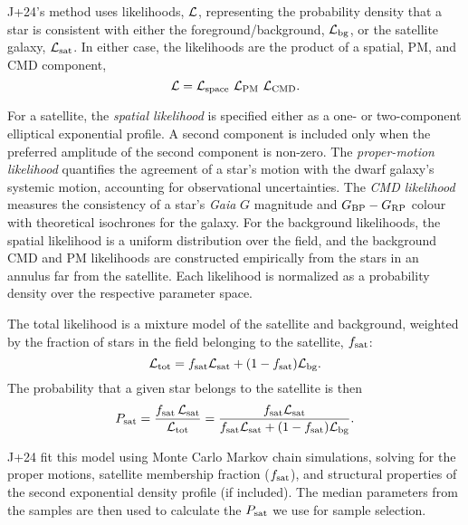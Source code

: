 J+24's method uses likelihoods, \({\cal L}\), representing the
probability density that a star is consistent with either the
foreground/background, \({\cal L}_{\rm bg}\), or the satellite galaxy,
\({\cal L}_{\rm sat}\). In either case, the likelihoods are the product
of a spatial, PM, and CMD component, \begin{equation}{
{\cal L} = {\cal L}_{\rm space}\ {\cal L}_{\rm PM}\ {\cal L}_{\rm CMD}.
}\end{equation}

For a satellite, the \emph{spatial likelihood} is specified either as a
one- or two-component elliptical exponential profile. A second component
is included only when the preferred amplitude of the second component is
non-zero. The \emph{proper-motion likelihood} quantifies the agreement
of a star's motion with the dwarf galaxy's systemic motion, accounting
for observational uncertainties. The \emph{CMD likelihood} measures the
consistency of a star's \emph{Gaia} \(G\) magnitude and
\(G_{\rm BP}- G_{\rm RP}\) colour with theoretical isochrones for the
galaxy. For the background likelihoods, the spatial likelihood is a
uniform distribution over the field, and the background CMD and PM
likelihoods are constructed empirically from the stars in an annulus far
from the satellite. Each likelihood is normalized as a probability
density over the respective parameter space.

The total likelihood is a mixture model of the satellite and background,
weighted by the fraction of stars in the field belonging to the
satellite, \(f_{\rm sat}\): \begin{equation}{
{\cal L}_{\rm tot} = f_{\rm sat}{\cal L}_{\rm sat} + (1-f_{\rm sat}){\cal L}_{\rm bg}.
}\end{equation} The probability that a given star belongs to the
satellite is then \begin{equation}{
P_{\rm sat} = 
\frac{f_{\rm sat}\,{\cal L}_{\rm sat}}{{\cal L}_{\rm tot}}
= \frac{f_{\rm sat}{\cal L}_{\rm sat}}{f_{\rm sat}{\cal L}_{\rm sat} + (1-f_{\rm sat}){\cal L}_{\rm bg}}.
}\end{equation}

J+24 fit this model using Monte Carlo Markov chain simulations, solving
for the proper motions, satellite membership fraction (\(f_{\rm sat}\)),
and structural properties of the second exponential density profile (if
included). The median parameters from the samples are then used to
calculate the \(P_{\rm sat}\) we use for sample selection.

